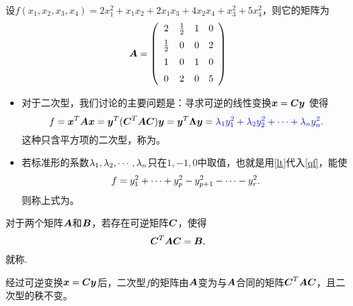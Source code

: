 \begin{frame}
  
  \begin{li}
    设$f(x_1,x_2,x_3,x_4)=2x_1^2+x_1x_2+2x_1x_3+4x_2x_4+x_3^2+5x_4^2$，则它的矩阵为
    $$
    \boldsymbol{A}=\left(
      \begin{array}{cccc}
        2&\frac12&1&0\\[0.2cm]
        \frac12&0&0&2\\[0.2cm]
        1&0&1&0\\[0.2cm]
        0&2&0&5
      \end{array}
    \right)
    $$
  \end{li}
  
\end{frame}

\begin{frame}
  
  \begin{itemize}
  \item 对于二次型，我们讨论的主要问题是：寻求可逆的线性变换${\boldsymbol{x}}=\boldsymbol{C}{\boldsymbol{y}}$
    使得
    $$
    f={\boldsymbol{x}}^T\boldsymbol{A}{\boldsymbol{x}}={\boldsymbol{y}}^T(\boldsymbol{C}^T\boldsymbol{A}\boldsymbol{C}){\boldsymbol{y}}={\boldsymbol{y}}^T\boldsymbol{\Lambda}{\boldsymbol{y}}=\textcolor{blue}{\lambda_1y_1^2+\lambda_2y_2^2+\cdots+\lambda_ny_n^2.}
    $$
    这种只含平方项的二次型，称为。\\[0.2in]

    \item 若标准形的系数$\lambda_1,\lambda_2,\cdots,\lambda_n$只在$1,-1,0$中取值，也就是用\eqref{lt}代入\eqref{qf}，能使
    $$
    f=y_1^2+\cdots+y_p^2-y_{p+1}^2-\cdots-y_r^2.
    $$
    则称上式为。
  \end{itemize}
\end{frame}



\begin{frame}
  
  \begin{dingyi}[矩阵的合同]
    对于两个矩阵$\boldsymbol{A}$和$\boldsymbol{B}$，若存在可逆矩阵$\boldsymbol{C}$，使得
    $$
    \boldsymbol{C}^T\boldsymbol{A}\boldsymbol{C}=\boldsymbol{B},
    $$
    就称.
  \end{dingyi}
  
\end{frame}

\begin{frame}
  \begin{jielun}

    经过可逆变换${\boldsymbol{x}}=\boldsymbol{C}{\boldsymbol{y}}$后，二次型$f$的矩阵由$\boldsymbol{A}$变为与$\boldsymbol{A}$合同的矩阵$\boldsymbol{C}^T\boldsymbol{A}\boldsymbol{C}$，且二次型的秩不变。
  \end{jielun}
\end{frame}


